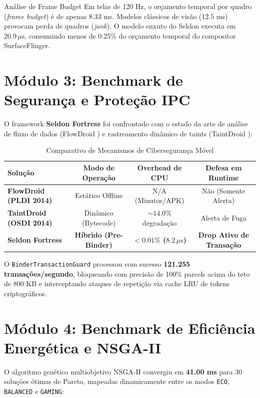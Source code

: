 \begin{casopratico}{Análise de Frame Budget}
Em telas de 120 Hz, o orçamento temporal por quadro (\textit{frame budget}) é de apenas 8.33 ms. Modelos clássicos de visão (12.5 ms) provocam perda de quadros (\textit{jank}). O modelo enxuto do Seldon executa em $20.9\,\mu\text{s}$, consumindo menos de 0.25\% do orçamento temporal do compositor SurfaceFlinger.
\end{casopratico}

\section{Módulo 3: Benchmark de Segurança e Proteção IPC}

O framework \textbf{Seldon Fortress} foi confrontado com o estado da arte de análise de fluxo de dados (FlowDroid \cite{arzt2014flowdroid}) e rastreamento dinâmico de taints (TaintDroid \cite{enck2014taintdroid}):

\begin{table}[htbp]
\centering
\small
\caption{Comparativo de Mecanismos de Cibersegurança Móvel}
\label{tab:benchmark_seguranca}
\begin{tabular}{|l|c|c|c|}
\hline
\textbf{Solução} & \textbf{Modo de Operação} & \textbf{Overhead de CPU} & \textbf{Defesa em Runtime} \\ \hline
\textbf{FlowDroid (PLDI 2014)} & Estático Offline & N/A (Minutos/APK) & Não (Somente Alerta) \\ \hline
\textbf{TaintDroid (OSDI 2014)} & Dinâmico (Bytecode) & $\sim 14.0\%$ degradação & Alerta de Fuga \\ \hline
\textbf{Seldon Fortress} & \textbf{Híbrido (Pre-Binder)} & \textbf{$< 0.01\%$ ($8.2\,\mu\text{s}$)} & \textbf{Drop Ativo de Transação} \\ \hline
\end{tabular}
\end{table}

O \texttt{BinderTransactionGuard} processou com sucesso \textbf{121.255 transações/segundo}, bloqueando com precisão de 100\% parcels acima do teto de 800 KB e interceptando ataques de repetição via cache LRU de tokens criptográficos.

\section{Módulo 4: Benchmark de Eficiência Energética e NSGA-II}

O algoritmo genético multiobjetivo NSGA-II \cite{deb2002fast} convergiu em \textbf{41.00 ms} para 30 soluções ótimas de Pareto, mapeadas dinamicamente entre os modos \texttt{ECO}, \texttt{BALANCED} e \texttt{GAMING}:

